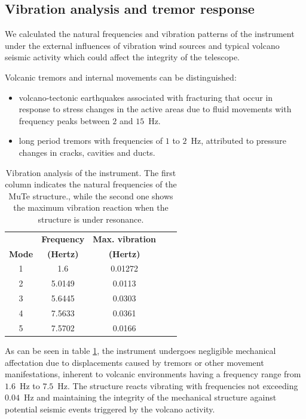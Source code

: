 \documentclass[letterpaper,11pt]{article}
\begin{document}
\subsection{Vibration analysis and tremor response}
We calculated the natural frequencies and vibration patterns of the instrument under the external influences of vibration wind sources and typical volcano seismic activity which could affect the integrity of the telescope. 

Volcanic tremors and internal movements can be distinguished\cite{mcnutt1992volcanic,londono2001spectral,langer2006automatic,chouet2003volcano}: 
\begin{itemize}
    \item volcano-tectonic earthquakes associated with fracturing that occur in response to stress changes in the active areas due to fluid movements with frequency peaks between $2$ and $15$~Hz.
    \item long period tremors with frequencies of $1$ to $2$~Hz, attributed to pressure changes in cracks, cavities and ducts. 
\end{itemize}
\begin{table}[htb]
\begin{center}
\begin{tabular}{ccccc}
\hline
& {\bf Frequency}  & {\bf Max. vibration}\\
{\bf Mode}  & {\bf (Hertz)}  & {\bf (Hertz)} \\
\hline
1 & 1.6 & 0.01272\\ 
2  & 5.0149  & 0.0113 \\
3  & 5.6445  & 0.0303 \\
4  & 7.5633  & 0.0361 \\
5  & 7.5702  & 0.0166 \\
\hline
\end{tabular}
\end{center}
\caption{Vibration analysis of the instrument. The first column indicates the natural frequencies of the MuTe structure., while the second one shows the maximum vibration reaction when the structure is under resonance.}
\label{Table_nat_frec1}
\end{table}

As can be seen in table \ref{Table_nat_frec1}, the instrument undergoes negligible mechanical affectation due to displacements caused by tremors or other movement manifestations, inherent to volcanic environments having a frequency range from $1.6$~Hz to $7.5$~Hz. The structure reacts vibrating with frequencies not exceeding $0.04$~Hz and maintaining the integrity of the mechanical structure against potential seismic events triggered by the volcano activity. 
\end{document}
